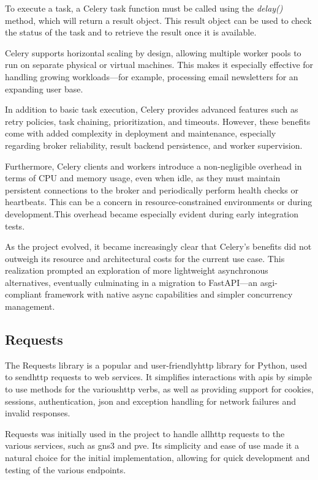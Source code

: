   To execute a task, a Celery task function must be called using the \textit{delay()} method, which will return a result object. 
  This result object can be used to check the status of the task and to retrieve the result once it is available.

  Celery supports horizontal scaling by design, allowing multiple worker pools to run on separate physical or virtual machines. 
  This makes it especially effective for handling growing workloads—for example, processing email newsletters for an expanding 
  user base.

  In addition to basic task execution, Celery provides advanced features such as retry policies, task chaining, prioritization, 
  and timeouts. However, these benefits come with added complexity in deployment and maintenance, especially regarding broker 
  reliability, result backend persistence, and worker supervision.

  Furthermore, Celery clients and workers introduce a non-negligible overhead in terms of CPU and memory usage, even when 
  idle, as they must maintain persistent connections to the broker and periodically perform health checks or heartbeats. 
  This can be a concern in resource-constrained environments or during development.This overhead became especially evident 
  during early integration tests.

  As the project evolved, it became increasingly clear that Celery's benefits did not outweigh its resource and 
  architectural costs for the current use case. This realization prompted an exploration of more lightweight asynchronous 
  alternatives, eventually culminating in a migration to FastAPI—an \ac{asgi}-compliant framework with native async capabilities 
  and simpler concurrency management.


\subsection{Requests}
  The Requests\cite{requests2025} library is a popular and user-friendly\ac{http} library for Python, used to send\ac{http} 
  requests to web services. It simplifies interactions with \ac{api}s by simple to use methods for the various\ac{http} verbs, 
  as well as providing support for cookies, sessions, authentication, \ac{json} and exception handling for network failures and 
  invalid responses.

  Requests was initially used in the project to handle all\ac{http} requests to the various services, such as
  \ac{gns3} and \ac{pve}. Its simplicity and ease of use made it a natural choice for the initial implementation, allowing
  for quick development and testing of the various endpoints.

